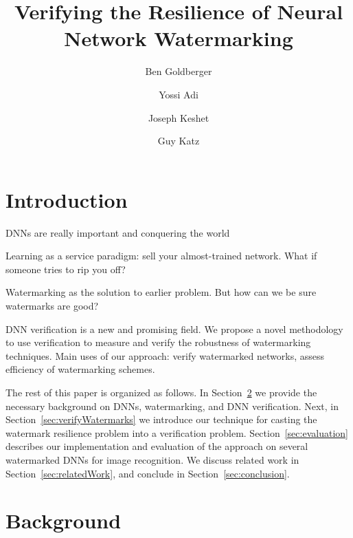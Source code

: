 \documentclass[a4paper]{llncs}
\begin{document}
\title{Verifying the Resilience of Neural Network Watermarking}

\author{
  Ben Goldberger \and
  Yossi Adi \and
  Joseph Keshet \and
  Guy Katz 
}


\maketitle

\section{Introduction}


DNNs are really important and conquering the world

Learning as a service paradigm: sell your almost-trained network. What
if someone tries to rip you off?

Watermarking as the solution to earlier problem. But how can we be
sure watermarks are good?

DNN verification is a new and promising field. We propose a novel
methodology to use verification to measure and verify the robustness
of watermarking techniques.
Main uses of our approach: verify watermarked networks, assess
efficiency of watermarking schemes.

The rest of this paper is organized as follows. In
Section~\ref{sec:background} we provide the necessary background on
DNNs, watermarking, and DNN verification. Next, in
Section~\ref{sec:verifyWatermarks} we introduce our technique for
casting the watermark resilience problem into a verification
problem. Section~\ref{sec:evaluation} describes our implementation and
evaluation of the approach on several watermarked DNNs for image
recognition. We discuss related work in Section~\ref{sec:relatedWork},
and conclude in Section~\ref{sec:conclusion}.

\section{Background}
\label{sec:background}

\cite{KaBaDiJuKo17Reluplex,KaHuIbJuLaLiShThWuZeDiKoBa19Marabou}
\end{document}
